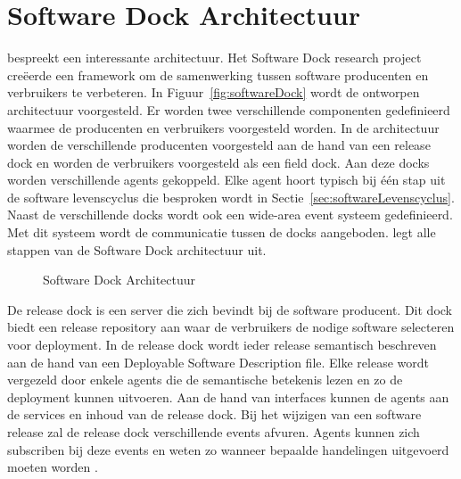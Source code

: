 \section{Software Dock Architectuur}\label{sec:softwareDock}
\citet{hall1999cooperative} bespreekt een interessante architectuur.
Het Software Dock research project creëerde een framework om de samenwerking tussen software producenten en verbruikers te verbeteren.
In Figuur~\vref{fig:softwareDock} wordt de ontworpen architectuur voorgesteld.
Er worden twee verschillende componenten gedefinieerd waarmee de producenten en verbruikers voorgesteld worden.
In de architectuur worden de verschillende producenten voorgesteld aan de hand van een release dock en worden de verbruikers voorgesteld als een field dock.
Aan deze docks worden verschillende agents gekoppeld.
Elke agent hoort typisch bij één stap uit de software levenscyclus die besproken wordt in Sectie~\vref{sec:softwareLevenscyclus}.
Naast de verschillende docks wordt ook een wide-area event systeem gedefinieerd.
Met dit systeem wordt de communicatie tussen de docks aangeboden.
\citet{hall1997architecture} legt alle stappen van de Software Dock architectuur uit.

\begin{figure}[!ht]
\centering
{}
\caption{Software Dock Architectuur \citep{hall1999cooperative}}
\label{fig:softwareDock}
\end{figure}

De release dock is een server die zich bevindt bij de software producent.
Dit dock biedt een release repository aan waar de verbruikers de nodige software selecteren voor deployment.
In de release dock wordt ieder release semantisch beschreven aan de hand van een Deployable Software Description file.
Elke release wordt vergezeld door enkele agents die de semantische betekenis lezen en zo de deployment kunnen uitvoeren.
Aan de hand van interfaces kunnen de agents aan de services en inhoud van de release dock.
Bij het wijzigen van een software release zal de release dock verschillende events afvuren.
Agents kunnen zich subscriben bij deze events en weten zo wanneer bepaalde handelingen uitgevoerd moeten worden \citep{hall1999cooperative}.

